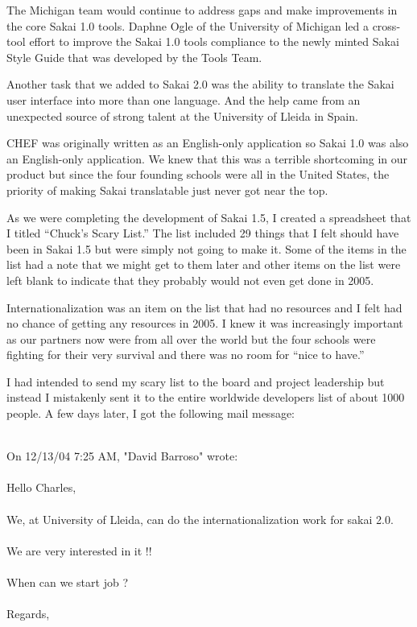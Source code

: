 \documentclass[12pt]{book}
\begin{document}
The Michigan team would continue to address gaps and make
improvements in the core Sakai 1.0 tools.  Daphne Ogle
of the University of Michigan led a cross-tool effort to
improve the Sakai 1.0 tools compliance to the newly minted
Sakai Style Guide that was developed by the Tools Team.

Another task that we added to Sakai 2.0 was the ability
to translate the Sakai user interface into more than one
language.  And the help came from an unexpected source
of strong talent at the University of Lleida in Spain.

CHEF was originally written as an English-only application
so Sakai 1.0 was also an English-only application.
We knew that this was a terrible shortcoming in our product
but since the four founding schools were all in the
United States, the priority of making Sakai translatable
just never got near the top.

As we were completing the development of Sakai 1.5,
I created a
spreadsheet that I titled ``Chuck's Scary List.''
The list included 29 things that I felt should have been in
Sakai 1.5 but were simply not going to make it.
Some of the items in the
list had a note that we might get to them later
and other items on the list were left blank to
indicate that they probably would not even get
done in 2005.

Internationalization was an item on the list that
had no resources and I felt had no chance of getting
any resources in 2005.  I knew it was increasingly
important as our partners now were from all
over the world but the four schools were fighting
for their very survival and there was no room
for ``nice to have.''

I had intended to send my scary list to the board
and project leadership but instead I
mistakenly sent it to the entire worldwide developers
list of about 1000 people.  A few days later,
I got the following mail message:\\
\\
\begin{sf}
On 12/13/04 7:25 AM, "David Barroso" wrote:\\
\\
Hello Charles,\\
\\
We, at University of Lleida, can do the
internationalization work for sakai 2.0.\\
\\
We are very interested in it !!\\
\\
When can we start job ?\\
\\
Regards,\\
\end{sf}
\end{document}
